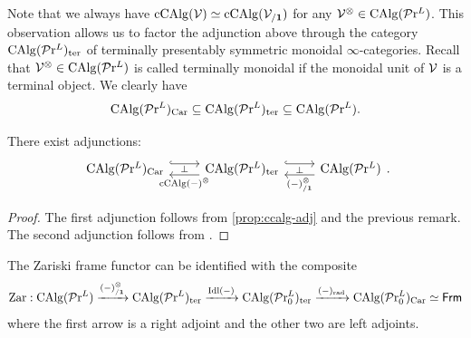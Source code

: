 \documentclass[10pt,a4paper,oneside]{article}
\begin{document}
\begin{rem}
Note that we always have $\operatorname{cCAlg}(\mathcal{V})\simeq\operatorname{cCAlg}(\mathcal{V}_{/\mathbf{1}})$ for any $\mathcal{V}^\otimes\in \operatorname{CAlg}(\mathcal{P}\mathrm{r}^L)$. This observation allows us to factor the adjunction above through the category $\operatorname{CAlg}(\mathcal{P}\mathrm{r}^L)_{\operatorname{ter}}$ of terminally presentably symmetric monoidal $\infty$-categories. Recall that $\mathcal{V}^\otimes\in \operatorname{CAlg}(\mathcal{P}\mathrm{r}^L)$ is called terminally monoidal if the monoidal unit of $\mathcal{V}$ is a terminal object. We clearly have $$
\operatorname{CAlg}(\mathcal{P}\mathrm{r}^L)_{\operatorname{Car}}\subseteq\operatorname{CAlg}(\mathcal{P}\mathrm{r}^L)_{\operatorname{ter}}\subseteq\operatorname{CAlg}(\mathcal{P}\mathrm{r}^L).
$$
\end{rem}

\begin{prop}
There exist adjunctions:
$$\begin{tikzcd}
\calg(\prl)_{\op{Car}}  \arrow[r, hook, shift right=-1ex]  & \arrow[l,"\perp"', "\op{cCAlg}(-)^\otimes", shift right=-1ex]  \calg(\prl)_{\op{ter}} 
\arrow[r,"\perp"', hook, shift right=-1ex] &
\arrow[l, "(-)^\otimes_{/\mb{1}}", shift right=-1ex]  \calg(\prl)
\end{tikzcd}.  $$
\end{prop}
\begin{proof}
The first adjunction follows from \cref{prop:ccalg-adj} and the previous remark. The second adjunction follows from \cite[Lemma~3.27]{aoki2023sheaves}.
\end{proof}

\begin{rem}
The Zariski frame functor can be identified with the composite $$\operatorname{Zar}: \operatorname{CAlg}(\mathcal{P}\mathrm{r}^L) \xrightarrow{(-)^\otimes_{/\mathbf{1}}}\operatorname{CAlg}(\mathcal{P}\mathrm{r}^L)_{\operatorname{ter}} \xrightarrow{\operatorname{Idl}(-)}\operatorname{CAlg}(\mathcal{P}\mathrm{r}^L_0)_{\operatorname{ter}}\xrightarrow{(-)_{\operatorname{rad}}}\operatorname{CAlg}(\mathcal{P}\mathrm{r}^L_0)_{\operatorname{Car}}\simeq \mathsf{Frm}$$
where the first arrow is a right adjoint and the other two are left adjoints.
\end{rem}

\end{document}
